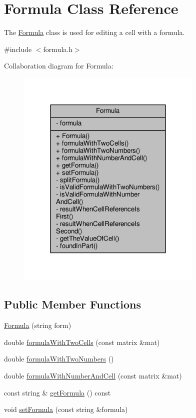 \hypertarget{class_formula}{}\section{Formula Class Reference}
\label{class_formula}


The \hyperlink{class_formula}{Formula} class is used for editing a cell with a formula.  




{\ttfamily \#include $<$formula.\+h$>$}



Collaboration diagram for Formula\+:\nopagebreak
\begin{figure}[H]
\begin{center}
\leavevmode
\includegraphics[width=252pt]{class_formula__coll__graph}
\end{center}
\end{figure}
\subsection*{Public Member Functions}
\begin{DoxyCompactItemize}
\item 
\hyperlink{class_formula_aed38ad076eb638148bcbe867d6acea60}{Formula} (string form)
\item 
double \hyperlink{class_formula_a518bc97bd50f1cc5573be7d3f8cb6253}{formula\+With\+Two\+Cells} (const matrix \&mat)
\item 
double \hyperlink{class_formula_a2159ffdb34d80f2bee422eee89fc871a}{formula\+With\+Two\+Numbers} ()
\item 
double \hyperlink{class_formula_a0f831b2ee98fbeb7df371f83ee7d374d}{formula\+With\+Number\+And\+Cell} (const matrix \&mat)
\item 
const string \& \hyperlink{class_formula_a1b9557287ed502f9523c5c7b1805bac1}{get\+Formula} () const
\item 
void \hyperlink{class_formula_aba7633655dad414ed0a1d92cdba38163}{set\+Formula} (const string \&formula)
\end{DoxyCompactItemize}
